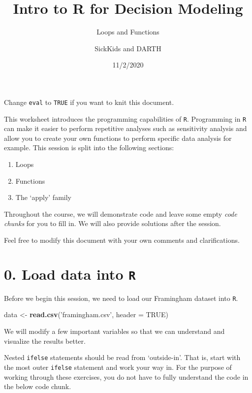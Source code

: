 \documentclass[
]{article}
\title{Intro to R for Decision Modeling}
\subtitle{Loops and Functions}
\author{SickKids and DARTH}
\date{11/2/2020}
\newenvironment{Shaded}{\begin{snugshade}}{\end{snugshade}}
\newcommand{\DataTypeTok}[1]{\textcolor[rgb]{0.13,0.29,0.53}{#1}}
\newcommand{\KeywordTok}[1]{\textcolor[rgb]{0.13,0.29,0.53}{\textbf{#1}}}
\newcommand{\NormalTok}[1]{#1}
\newcommand{\OtherTok}[1]{\textcolor[rgb]{0.56,0.35,0.01}{#1}}
\newcommand{\StringTok}[1]{\textcolor[rgb]{0.31,0.60,0.02}{#1}}
\begin{document}
\maketitle

Change \texttt{eval} to \texttt{TRUE} if you want to knit this document.

This worksheet introduces the programming capabilities of \texttt{R}.
Programming in \texttt{R} can make it easier to perform repetitive
analyses such as sensitivity analysis and allow you to create your own
functions to perform specific data analysis for example. This session is
split into the following sections:

\begin{enumerate}
\def\labelenumi{\arabic{enumi}.}
\item
  Loops
\item
  Functions
\item
  The `apply' family
\end{enumerate}

Throughout the course, we will demonstrate code and leave some empty
\emph{code chunks} for you to fill in. We will also provide solutions
after the session.

Feel free to modify this document with your own comments and
clarifications.

\hypertarget{load-data-into-r}{%
\section{\texorpdfstring{0. Load data into
\texttt{R}}{0. Load data into R}}\label{load-data-into-r}}

Before we begin this session, we need to load our Framingham dataset
into \texttt{R}.

\begin{Shaded}
\begin{Highlighting}[]
\NormalTok{data <-}\StringTok{ }\KeywordTok{read.csv}\NormalTok{(}\StringTok{'framingham.csv'}\NormalTok{, }\DataTypeTok{header =} \OtherTok{TRUE}\NormalTok{)}
\end{Highlighting}
\end{Shaded}

We will modify a few important variables so that we can understand and
visualize the results better.

Nested \texttt{ifelse} statements should be read from `outside-in'. That
is, start with the most outer \texttt{ifelse} statement and work your
way in. For the purpose of working through these exercises, you do not
have to fully understand the code in the below code chunk.
\end{document}
